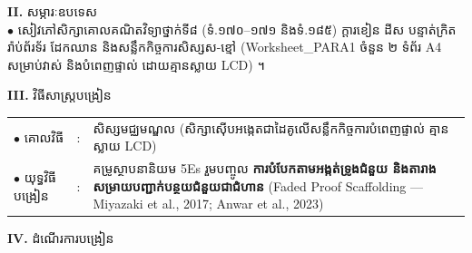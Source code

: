 \documentclass[a4paper,10pt]{article}
\newcommand{\en}[1]{{\TimesEn #1}}
\begin{document}
{\vspace{1pt}

\textbf{II.} {\muol សម្ភារៈឧបទេស}\\[1pt]
\hspace*{0.55cm}$\bullet$ \hspace{0.35cm} សៀវភៅសិក្សាគោលគណិតវិទ្យាថ្នាក់ទី៨ (ទំ.១៧០--១៧១ និងទំ.១៨៥) ក្ដារខៀន ដីស បន្ទាត់ក្រិត រ៉ាប់ព័រទ័រ ដែកឈាន និងសន្លឹកកិច្ចការសិស្សស-ខ្មៅ (\en{Worksheet\_PARA1} ចំនួន ២ ទំព័រ \en{A4} សម្រាប់វាស់ និងបំពេញផ្ទាល់ ដោយគ្មានស្លាយ \en{LCD}) ។

\vspace{1pt}

\textbf{III.} {\muol វិធីសាស្រ្តបង្រៀន}\\[1pt]
\hspace*{0.45cm}%
\begin{tabular}{@{}l l L{14.85cm}@{}}
  $\bullet$ \hspace{0.25cm} គោលវិធី & : & សិស្សមជ្ឈមណ្ឌល (សិក្សាស៊ើបអង្កេតជាដៃគូលើសន្លឹកកិច្ចការបំពេញផ្ទាល់ គ្មានស្លាយ \en{LCD}) \\
  $\bullet$ \hspace{0.25cm} យុទ្ធវិធីបង្រៀន & : & គម្រូស្ថាបនានិយម \en{5Es} រួមបញ្ចូល \textbf{ការបំបែកតាមអង្កត់ទ្រូងជំនួយ និងតារាងសម្រាយបញ្ជាក់បន្ថយជំនួយជាជំហាន} (\en{Faded Proof Scaffolding — Miyazaki et al., 2017; Anwar et al., 2023}) \\
\end{tabular}
}

\vspace{1pt}

\textbf{IV.} {\muol ដំណើរការបង្រៀន}

\vspace{1pt}
\end{document}
